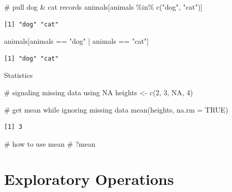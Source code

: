 \documentclass[
  letterpaper,
  DIV=11,
  numbers=noendperiod]{scrreprt}
\newenvironment{Shaded}{\begin{snugshade}}{\end{snugshade}}
\newcommand{\AttributeTok}[1]{\textcolor[rgb]{0.40,0.45,0.13}{#1}}
\newcommand{\CommentTok}[1]{\textcolor[rgb]{0.37,0.37,0.37}{#1}}
\newcommand{\ConstantTok}[1]{\textcolor[rgb]{0.56,0.35,0.01}{#1}}
\newcommand{\DecValTok}[1]{\textcolor[rgb]{0.68,0.00,0.00}{#1}}
\newcommand{\FunctionTok}[1]{\textcolor[rgb]{0.28,0.35,0.67}{#1}}
\newcommand{\NormalTok}[1]{\textcolor[rgb]{0.00,0.23,0.31}{#1}}
\newcommand{\OtherTok}[1]{\textcolor[rgb]{0.00,0.23,0.31}{#1}}
\newcommand{\SpecialCharTok}[1]{\textcolor[rgb]{0.37,0.37,0.37}{#1}}
\newcommand{\StringTok}[1]{\textcolor[rgb]{0.13,0.47,0.30}{#1}}
\begin{document}
\begin{Shaded}
\begin{Highlighting}[]
\CommentTok{\# pull dog \& cat records}
\NormalTok{animals[animals }\SpecialCharTok{\%in\%} \FunctionTok{c}\NormalTok{(}\StringTok{"dog"}\NormalTok{, }\StringTok{"cat"}\NormalTok{)]}
\end{Highlighting}
\end{Shaded}

\begin{verbatim}
[1] "dog" "cat"
\end{verbatim}

\begin{Shaded}
\begin{Highlighting}[]
\NormalTok{animals[animals }\SpecialCharTok{==} \StringTok{"dog"} \SpecialCharTok{|}\NormalTok{ animals }\SpecialCharTok{==} \StringTok{"cat"}\NormalTok{]}
\end{Highlighting}
\end{Shaded}

\begin{verbatim}
[1] "dog" "cat"
\end{verbatim}

Statistics

\begin{Shaded}
\begin{Highlighting}[]
\CommentTok{\# signaling missing data using NA}
\NormalTok{heights }\OtherTok{\textless{}{-}} \FunctionTok{c}\NormalTok{(}\DecValTok{2}\NormalTok{, }\DecValTok{3}\NormalTok{, }\ConstantTok{NA}\NormalTok{, }\DecValTok{4}\NormalTok{)}

\CommentTok{\# get mean while ignoring missing data}
\FunctionTok{mean}\NormalTok{(heights, }\AttributeTok{na.rm =} \ConstantTok{TRUE}\NormalTok{)}
\end{Highlighting}
\end{Shaded}

\begin{verbatim}
[1] 3
\end{verbatim}

\begin{Shaded}
\begin{Highlighting}[]
\CommentTok{\# how to use mean}
\CommentTok{\# ?mean}
\end{Highlighting}
\end{Shaded}

\section{Exploratory Operations}\label{exploratory-operations}
\end{document}
